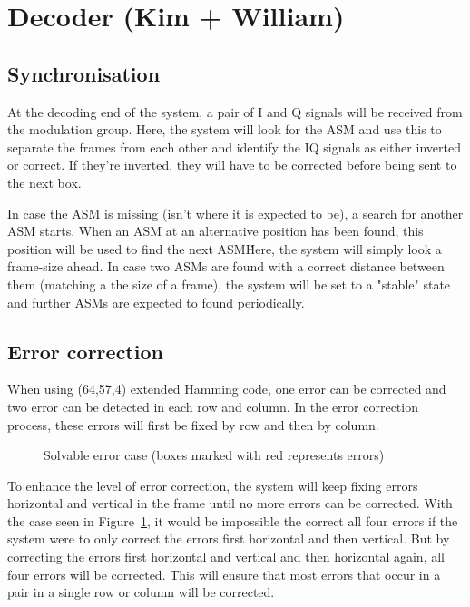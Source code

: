 \section{Decoder (Kim + William)}

\subsection{Synchronisation}
At the decoding end of the system, a pair of I and Q signals will be received from the modulation group. Here, the system will look for the ASM and use this to separate the frames from each other and identify the IQ signals as either inverted or correct. If they’re inverted, they will have to be corrected before being sent to the next box.

In case the ASM is missing (isn't where it is expected to be), a search for another ASM starts.  When an ASM at an alternative position has been found, this position will be used to find the next ASM\. Here, the system will simply look a frame-size ahead. In case two ASMs are found with a correct distance between them (matching a the size of a frame), the system will be set to a "stable" state and further ASMs are expected to found periodically.

\subsection{Error correction}
When using (64,57,4) extended Hamming code, one error can be corrected and two error can be detected in each row and column. In the error correction process, these errors will first be fixed by row and then by column.

\begin{figure}[h!]
  \centering
  \caption{Solvable error case (boxes marked with red represents errors)}
  \label{fig:error-case-1}
\end{figure}

To enhance the level of error correction, the system will keep fixing errors horizontal and vertical in the frame until no more errors can be corrected. With the case seen in Figure~\ref{fig:error-case-1}, it would be impossible the correct all four errors if the system were to only correct the errors first horizontal and then vertical. But by correcting the errors first horizontal and vertical and then horizontal again, all four errors will be corrected. This will ensure that most errors that occur in a pair in a single row or column will be corrected.


